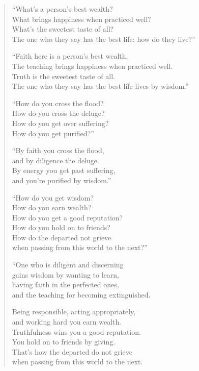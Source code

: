 \documentclass[12pt,openany]{book}%
\begin{document}
\begin{verse}%
“What’s a person’s best wealth? \\
What brings happiness when practiced well? \\
What’s the sweetest taste of all? \\
The one who they say has the best life: how do they live?” 

“Faith here is a person’s best wealth. \\
The teaching brings happiness when practiced well. \\
Truth is the sweetest taste of all. \\
The one who they say has the best life lives by wisdom.” 

“How do you cross the flood? \\
How do you cross the deluge? \\
How do you get over suffering? \\
How do you get purified?” 

“By faith you cross the flood, \\
and by diligence the deluge. \\
By energy you get past suffering, \\
and you’re purified by wisdom.” 

“How do you get wisdom? \\
How do you earn wealth? \\
How do you get a good reputation? \\
How do you hold on to friends? \\
How do the departed not grieve \\
when passing from this world to the next?” 

“One who is diligent and discerning \\
gains wisdom by wanting to learn, \\
having faith in the perfected ones, \\
and the teaching for becoming extinguished. 

Being responsible, acting appropriately, \\
and working hard you earn wealth. \\
Truthfulness wins you a good reputation. \\
You hold on to friends by giving. \\
That’s how the departed do not grieve \\
when passing from this world to the next. 


\end{verse}
\end{document}
